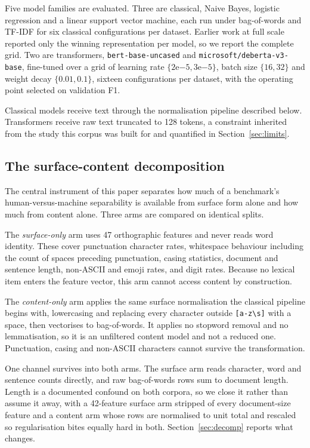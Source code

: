 Five model families are evaluated. Three are classical, Naive Bayes, logistic regression and a linear support vector machine, each run under bag-of-words and TF-IDF for six classical configurations per dataset. Earlier work at full scale reported only the winning representation per model, so we report the complete grid. Two are transformers, \texttt{bert-base-uncased} and \texttt{microsoft/deberta-v3-base}, fine-tuned over a grid of learning rate $\{2\mathrm{e}{-5}, 3\mathrm{e}{-5}\}$, batch size $\{16, 32\}$ and weight decay $\{0.01, 0.1\}$, sixteen configurations per dataset, with the operating point selected on validation F1.

Classical models receive text through the normalisation pipeline described below. Transformers receive raw text truncated to 128 tokens, a constraint inherited from the study this corpus was built for and quantified in Section~\ref{sec:limits}.

\subsection{The surface-content decomposition}

The central instrument of this paper separates how much of a benchmark's human-versus-machine separability is available from surface form alone and how much from content alone. Three arms are compared on identical splits.

The \emph{surface-only} arm uses 47 orthographic features and never reads word identity. These cover punctuation character rates, whitespace behaviour including the count of spaces preceding punctuation, casing statistics, document and sentence length, non-ASCII and emoji rates, and digit rates. Because no lexical item enters the feature vector, this arm cannot access content by construction.

The \emph{content-only} arm applies the same surface normalisation the classical pipeline begins with, lowercasing and replacing every character outside \texttt{[a-z\textbackslash s]} with a space, then vectorises to bag-of-words. It applies no stopword removal and no lemmatisation, so it is an unfiltered content model and not a reduced one. Punctuation, casing and non-ASCII characters cannot survive the transformation.

One channel survives into both arms. The surface arm reads character, word and sentence counts directly, and raw bag-of-words rows sum to document length. Length is a documented confound on both corpora, so we close it rather than assume it away, with a 42-feature surface arm stripped of every document-size feature and a content arm whose rows are normalised to unit total and rescaled so regularisation bites equally hard in both. Section~\ref{sec:decomp} reports what changes.

